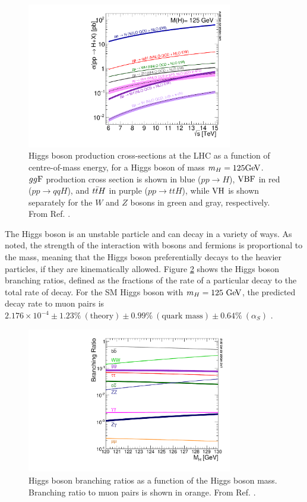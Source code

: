 \begin{figure}[h]
  \centering
  \includegraphics[width=0.8\textwidth]{figures/theory/HiggsProduction}
  \caption[Higgs boson production cross-sections at the LHC.]{Higgs boson production
  cross-sections at the LHC as a function of centre-of-mass energy, for a Higgs boson
  of mass $m_H = 125 \text{Ge\kern -0.1em V}$. $gg\text{F}$ production cross section is shown in blue
  ($pp \rightarrow H$), $\text{VBF}$ in red ($pp \rightarrow qqH$), and $t\bar{t} H$ in purple
  ($pp \rightarrow ttH$), while $\text{VH}$ is shown separately for the $W$ and $Z$ bosons
  in green and gray, respectively. From Ref. \cite{deFlorian:2016spz}.}
   \label{fig:the:prod}
\end{figure}

The Higgs boson is an unstable particle and can decay in a variety of ways. As noted,
the strength of the interaction with bosons and fermions is proportional to the mass,
meaning that the Higgs boson preferentially decays to the heavier particles, if they
are kinematically allowed. Figure \ref{fig:the:decay} shows the Higgs boson branching
ratios, defined as the fractions of the rate of a particular decay to the total
rate of decay. For the SM Higgs boson with $m_H = 125~\text{Ge\kern -0.1em V}$, the predicted decay rate to muon pairs
is $2.176 \times 10^{-4}
\pm 1.23\%~(\text{theory})
\pm 0.99\%~(\text{quark mass})
\pm 0.64\%~(\alpha_S)$ \cite{deFlorian:2016spz}. 

\begin{figure}[h]
  \centering
  \includegraphics[width=0.8\textwidth]{figures/theory/HiggsDecay}
  \caption[Higgs boson branching ratios.]{Higgs boson branching ratios as a function
  of the Higgs boson mass. Branching ratio to muon pairs is shown in orange.
  From Ref. \cite{deFlorian:2016spz}.}
   \label{fig:the:decay}
\end{figure}

